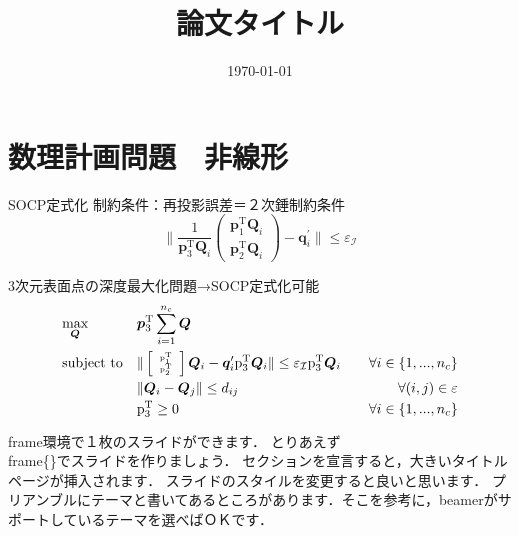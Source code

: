 \documentclass[dvipdfmx]{beamer}
\title{ 論文タイトル \cite{latex2e}}
\date{\today}
\author{}
\institute{}
\begin{document}
  \maketitle
  \section{数理計画問題　非線形}
  \begin{frame}{SOCP定式化}
    制約条件：再投影誤差＝２次錘制約条件
    \begin{equation}
        \| 
        \frac{1}{\mathrm{\bm{p}}_3^{\mathrm{T}} \bm{Q}_i} \left(
        \begin{array}{c}
          \mathrm{\bm{p}}_1^{\mathrm{T}} \bm{Q}_i  \\
          \mathrm{\bm{p}}_2^{\mathrm{T}} \bm{Q}_i
        \end{array}
      \right)
     - \bm{q}_i^{\prime}\| \le \varepsilon_{\mathcal{I}}
     \label{eq:cons_tmp_img}
    \end{equation}

    3次元表面点の深度最大化問題→SOCP定式化可能 \\
    \begin{equation}
        \begin{aligned}
            & \underset{\bm{Q}} {\text{max}} && {\bm{p}}_3^{\mathrm{T}} \sum_{i=1}^{n_c} \bm{Q}\\
        &\text{subject to} &&
            \tiny
            \| 
            \left[
            \begin{array}{c}
              \mathrm{\bm{p}}_1^{\mathrm{T}}  \\
              \mathrm{\bm{p}}_2^{\mathrm{T}}
            \end{array}
            \right] \bm{Q}_i
          - \bm{q}_i^{\prime}\mathrm{\bm{p}}_3^{\mathrm{T}} \bm{Q}_i \| \le \varepsilon_{\mathcal{I}} \mathrm{\bm{p}}_3^{\mathrm{T}} \bm{Q}_i \normalsize &&& \forall i \in \{1, ..., n_c\}\\
        &                  && \| \bm{Q}_i -\bm{Q}_j\| \le d_{ij}  &&& \forall(i, j) \in \varepsilon \\
        &                  && \mathrm{\bm{p}}_3^{\mathrm{T}} \ge 0  &&&  \forall i \in \{1, ..., n_c\}
        \end{aligned}
        \label{eq:socp}
    \end{equation}
  \end{frame}
  \begin{frame}{frame環境で１枚のスライドができます．}
      とりあえず\\frame\{\}でスライドを作りましょう．
      セクションを宣言すると，大きいタイトルページが挿入されます．
      スライドのスタイルを変更すると良いと思います．
      プリアンブルにテーマと書いてあるところがあります．そこを参考に，beamerがサポートしているテーマを選べばＯＫです．
  \end{frame}
\end{document}
